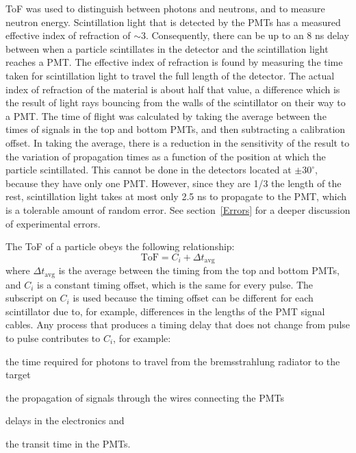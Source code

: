 ToF was used to distinguish between photons and neutrons, and to measure neutron energy.
Scintillation light that is detected by the PMTs has a measured effective index of refraction of $\sim$3.
Consequently, there can be up to an 8 ns delay between when a particle scintillates in the detector and the scintillation light reaches a PMT.
The effective index of refraction is found by measuring the time taken for scintillation light to travel the full length of the detector.
The actual index of refraction of the material is about half that value, a difference which is the result of light rays bouncing from the walls of the scintillator on their way to a PMT.
The time of flight was calculated by taking the average between the times of signals in the top and bottom PMTs, and then subtracting a calibration offset.
In taking the average, there is a reduction in the sensitivity of the result to the variation of propagation times as a function of the position at which the particle scintillated.
This cannot be done in the detectors located at $\pm30^{\circ}$, because they have only one PMT.
However, since they are 1/3 the length of the rest, scintillation light takes at most only 2.5 ns to propagate to the PMT, which is a tolerable amount of random error.
See section~\ref{Errors} for a deeper discussion of experimental errors.

The ToF of a particle obeys the following relationship:
\begin{displaymath}
\text{ToF} = C_i + \Delta t_{\text{avg}}
\end{displaymath}
where $\Delta t_{\text{avg}} $ is the average between the timing from the top and bottom PMTs, and $C_i$ is a constant timing offset, which is the same for every pulse.
The subscript on $C_i$ is used because the timing offset can be different for each scintillator due to, for example, differences in the lengths of the PMT signal cables.
Any process that produces a timing delay that does not change from pulse to pulse contributes to $C_{i}$,
for example: \begin{enumerate*}[font={\color{red!50!black}\bfseries}]
\item the time required for photons to travel from the bremsstrahlung radiator to the target
\item the propagation of signals through the wires connecting the PMTs
\item delays in the electronics and
\item the transit time in the PMTs.
\end{enumerate*}

